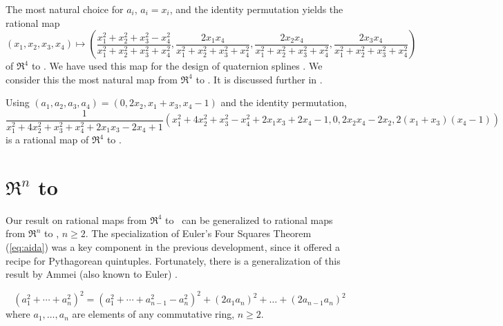 \begin{example}
\label{eg:mostnatural}
The most natural choice for $a_i$,
$a_i=x_i$, and the identity permutation
yields the rational map
\[
(x_1,x_2,x_3,x_4) \mapsto 
	(\frac{x_1^2 + x_2^2 + x_3^2 - x_4^2}{x_1^2 + x_2^2 + x_3^2 + x_4^2},
	 \frac{2x_1x_4}{x_1^2 + x_2^2 + x_3^2 + x_4^2}, 
	 \frac{2x_2x_4}{x_1^2 + x_2^2 + x_3^2 + x_4^2}, 
	 \frac{2x_3x_4}{x_1^2 + x_2^2 + x_3^2 + x_4^2})
\]
of $\Re^4$ to .
We have used this map for the design of quaternion splines \cite{jj95}.
We consider this the most natural map from $\Re^4$ to .
It is discussed further in \cite{jj98}.
\end{example}

\begin{example}
Using $(a_1,a_2,a_3,a_4) = (0,2x_2,x_1+x_3,x_4-1)$
and the identity permutation,
\footnotesize{
\[
\frac{1}{x_1^2 + 4x_2^2 + x_3^2 + x_4^2 + 2x_1x_3 - 2x_4 + 1}
	(x_1^2 + 4x_2^2 + x_3^2 - x_4^2 + 2x_1x_3 + 2x_4 - 1,
	 0,
	 2x_2x_4-2x_2,
	 2(x_1+x_3)(x_4-1))
\]
}
is a rational map of $\Re^4$ to .
%
\end{example}

\vspace{.5in}

\section{$\Re^n$ to }
\label{sec:nn}

Our result on rational maps from $\Re^4$ to \ can be generalized
to rational maps from $\Re^n$ to , $n \geq 2$.
The specialization of Euler's Four Squares Theorem (\ref{eq:aida})
was a key component in the previous development,
since it offered a recipe for Pythagorean quintuples.
Fortunately, there is a generalization of this result by
Ammei (also known to Euler) \cite{dickson52}. %

\begin{lemma}[Ammei]	%
\label{lem:ammei}
\begin{equation}
\label{eq:ammei}
	(a_1^2 + \cdots + a_n^2)^2 = 
	(a_1^2 + \cdots + a_{n-1}^2 - a_n^2)^2 + (2a_1a_n)^2 + \ldots + 
	(2a_{n-1}a_n)^2
\end{equation}
where $a_1,\ldots,a_n$ are elements of any commutative ring, $n \geq 2$.
\end{lemma}

